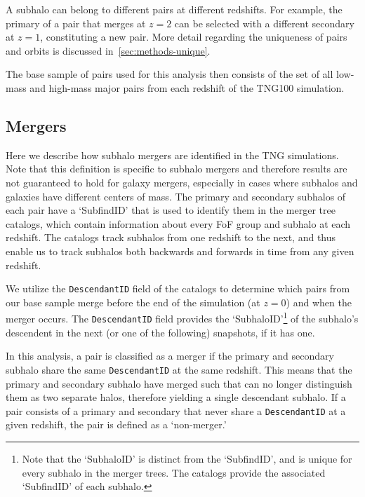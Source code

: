 \documentclass[twocolumn,linenumbers]{aastex631}
\begin{document}
A subhalo can belong to different pairs at different redshifts. 
For example, the primary of a pair that merges at $z=2$ can be selected with a different secondary at $z=1$, constituting a new pair. 
More detail regarding the uniqueness of pairs and orbits is discussed in~\ref{sec:methods-unique}.


The base sample of pairs used for this analysis then consists of the set of all low-mass and high-mass major pairs from each redshift of the TNG100 simulation. 

\subsection{Mergers} \label{subsec:mergers}
Here we describe how subhalo mergers are identified in the TNG simulations. 
Note that this definition is specific to subhalo mergers and therefore results are not guaranteed to hold for galaxy mergers, especially in cases where subhalos and galaxies have different centers of mass. %
The primary and secondary subhalos of each pair have a `SubfindID' that is used to identify them in the \subfind{} merger tree catalogs, which contain information about every FoF group and subhalo at each redshift. 
The \sublink{} catalogs track subhalos from one redshift to the next, and thus enable us to track subhalos both backwards and forwards in time from any given redshift. 

We utilize the \texttt{DescendantID} field of the \sublink{} catalogs to determine which pairs from our base sample merge before the end of the simulation (at $z=0$) and when the merger occurs. 
The \texttt{DescendantID} field provides the `SubhaloID'\footnote{Note that the `SubhaloID' is distinct from the `SubfindID', and is unique for every subhalo in the merger trees. 
The \sublink{} catalogs provide the associated `SubfindID' of each subhalo.} of the subhalo's descendent in the next (or one of the following) snapshots, if it has one. 

In this analysis, a pair is classified as a merger if the primary and secondary subhalo share the same \texttt{DescendantID} at the same redshift. 
This means that the primary and secondary subhalo have merged such that \subfind{} can no longer distinguish them as two separate halos, therefore yielding a single descendant subhalo.
If a pair consists of a primary and secondary that never share a \texttt{DescendantID} at a given redshift, the pair is defined as a `non-merger.'
\end{document}
